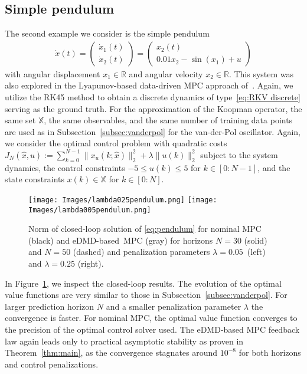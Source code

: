 \documentclass{article}
\numberwithin{equation}{section}
\newcommand{\bX}{\mathbb X}
\begin{document}
	
	\subsection{Simple pendulum}
	The second example we consider is the simple pendulum 
	\begin{align} \label{eq:pendulum}
	\dot{x}(t) = \begin{pmatrix}
	\dot x_1(t) \\ \dot x_2(t)
	\end{pmatrix} = \begin{pmatrix}
	x_2(t) \\ 0.01 x_2 - \sin(x_1) + u
	\end{pmatrix}
	\end{align}
	with angular displacement $x_1\in \mathbb{R}$ and angular velocity $x_2\in \mathbb{R}$. This system was also explored in the Lyapunov-based data-driven MPC approach of~\cite{NaraSon23}.
	Again, we utilize the RK45 method to obtain a discrete dynamics of type~\eqref{eq:RKV discrete}
	serving as the ground truth. For the approximation of the Koopman operator, the same set $\mathbb{X}$, the same observables, and the same number of training data points are used as in Subsection~\ref{subsec:vanderpol} for the van-der-Pol oscillator. 
	Again, we consider the optimal control problem with quadratic costs $J_N(\hat{x},u) := \sum_{k=0}^{N - 1} \|x_u(k;\hat{x})\|_2^2 + \lambda\|u(k)\|_2^2$ subject to the system dynamics, %
	the control constraints $-5 \leq u(k) \leq 5$ for $k \in [0:N-1]$, and the state constraints $x(k)\in \bX$ for $k \in [0:N]$.
	\begin{figure}[!h]
		\centering
		\texttt{[image: Images/lambda025pendulum.png]}
		\texttt{[image: Images/lambda005pendulum.png]}
		\caption{Norm of closed-loop solution of \eqref{eq:pendulum} for nominal MPC (black) and eDMD-based~MPC (gray) for horizons $N = 30$ (solid) and $N = 50$ (dashed) and penalization parameters $\lambda = 0.05$~(left) and $\lambda = 0.25$ (right).}
		\label{fig:pendulum}
	\end{figure}

	\noindent In Figure~\ref{fig:pendulum}, we inspect the closed-loop results.
	The evolution %
	of the optimal value functions are very similar to those in Subsection~\ref{subsec:vanderpol}. For larger prediction horizon $N$ and a smaller penalization parameter $\lambda$ the convergence is faster. For nominal MPC, the optimal value function converges to the precision of the optimal control solver used. The eDMD-based MPC feedback law again leads only to practical asymptotic stability as proven in Theorem~\ref{thm:main}, as the convergence stagnates around $10^{-8}$ for both horizons and control penalizations.
	
\end{document}
